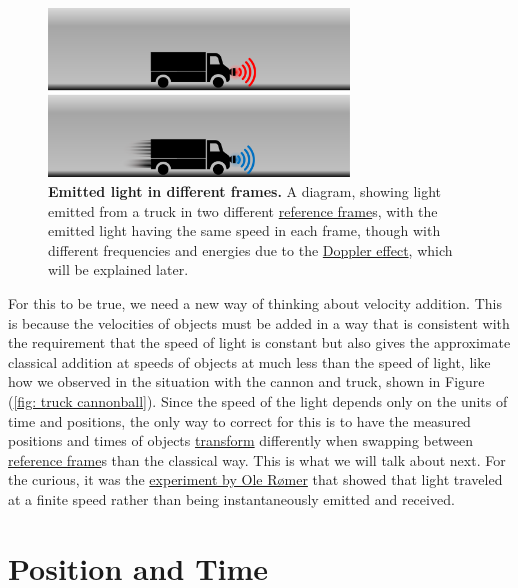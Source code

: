\begin{figure}[H]
	\centering
	\includegraphics[width = 8cm]{images/pdf/lorry_torch.pdf}
	\caption{\textbf{Emitted light in different frames.} A diagram, showing light emitted from a truck in two different \protect\hyperlink{def-Reference-frame}{reference frame}s, with the emitted light having the same speed in each frame, though with different frequencies and energies due to the \protect\hyperlink{def-doppler-effect}{Doppler effect}, which will be explained later.}
	\label{fig: truck torch}
\end{figure}

For this to be true, we need a new way of thinking about velocity addition.
This is because the velocities of objects must be added in a way that is consistent with the requirement that the speed of light is constant but also gives the approximate classical addition at speeds of objects at much less than the speed of light, like how we observed in the situation with the cannon and truck, shown in Figure (\ref{fig: truck cannonball}).
Since the speed of the light depends only on the units of time and positions, the only way to correct for this is to have the measured positions and times of objects \hyperlink{def-transform}{transform} differently when swapping between \hyperlink{def-Reference-frame}{reference frame}s than the classical way.
This is what we will talk about next.
For the curious, it was the \href{https://scienceready.com.au/pages/determination-of-speed-of-light}{experiment by Ole Rømer} that showed that light traveled at a finite speed rather than being instantaneously emitted and received.

\section{Position and Time} \label{sect: Position and Time}


